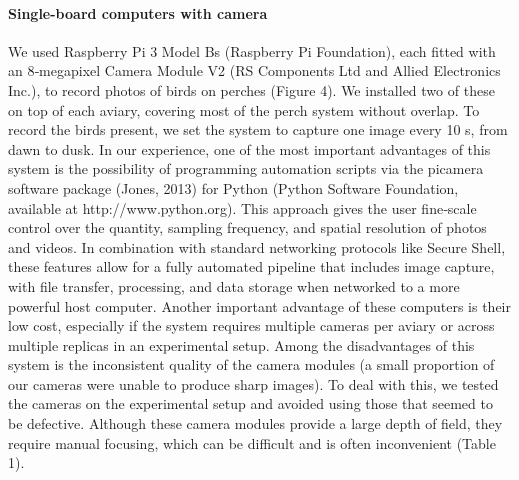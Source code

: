 \documentclass[11pt,a4paper,oneside]{article}
\begin{document}
\paragraph{Single-board computers with camera}
We used Raspberry Pi 3 Model Bs (Raspberry Pi Foundation), each fitted with an 8‐megapixel Camera Module V2 (RS Components Ltd and Allied Electronics Inc.), to record photos of birds on perches (Figure 4). We installed two of these on top of each aviary, covering most of the perch system without overlap. To record the birds present, we set the system to capture one image every 10 s, from dawn to dusk. In our experience, one of the most important advantages of this system is the possibility of programming automation scripts via the picamera software package (Jones, 2013) for Python (Python Software Foundation, available at http://www.python.org). This approach gives the user fine‐scale control over the quantity, sampling frequency, and spatial resolution of photos and videos. In combination with standard networking protocols like Secure Shell, these features allow for a fully automated pipeline that includes image capture, with file transfer, processing, and data storage when networked to a more powerful host computer. Another important advantage of these computers is their low cost, especially if the system requires multiple cameras per aviary or across multiple replicas in an experimental setup. Among the disadvantages of this system is the inconsistent quality of the camera modules (a small proportion of our cameras were unable to produce sharp images). To deal with this, we tested the cameras on the experimental setup and avoided using those that seemed to be defective. Although these camera modules provide a large depth of field, they require manual focusing, which can be difficult and is often inconvenient (Table 1).
\end{document}
